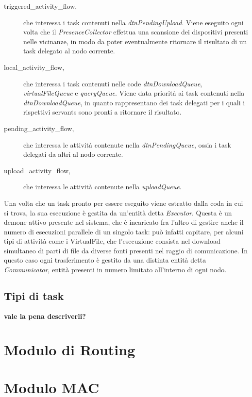 \begin{description}
\item[triggered\_activity\_flow,] che interessa i task contenuti nella \textit{dtnPendingUpload}. Viene eseguito ogni volta che il \textit{PresenceCollector} effettua una scansione dei dispositivi presenti nelle vicinanze, in modo da poter eventualmente ritornare il risultato di un task delegato al nodo corrente.
\item[local\_activity\_flow,] che interessa i task contenuti nelle code \textit{dtnDownloadQueue}, \textit{virtualFileQueue} e \textit{queryQueue}. Viene data priorità ai task contenuti nella \textit{dtnDownloadQueue}, in quanto rappresentano dei task delegati per i quali i rispettivi servants sono pronti a ritornare il risultato.
\item[pending\_activity\_flow,] che interessa le attività contenute nella \textit{dtnPendingQueue}, ossia i task delegati da altri al nodo corrente. 
\item[upload\_activity\_flow,] che interessa le attività contenute nella \textit{uploadQueue}.
\end{description}

Una volta che un task pronto per essere eseguito viene estratto dalla coda in cui si trova, la sua esecuzione è gestita da un'entità detta \textit{Executor}. Questa è un demone attivo presente nel sistema, che è incaricato fra l'altro di gestire anche il numero di esecuzioni parallele di un singolo task: può infatti capitare, per alcuni tipi di attività come i VirtualFile, che l'esecuzione consista nel download simultaneo di parti di file da diverse fonti presenti nel raggio di comunicazione. In questo caso ogni trasferimento è gestito da una distinta entità detta \textit{Communicator}, entità presenti in numero limitato all'interno di ogni nodo.

\subsection{Tipi di task}
\textbf{vale la pena descriverli?}

\section{Modulo di Routing}
\section{Modulo MAC}

